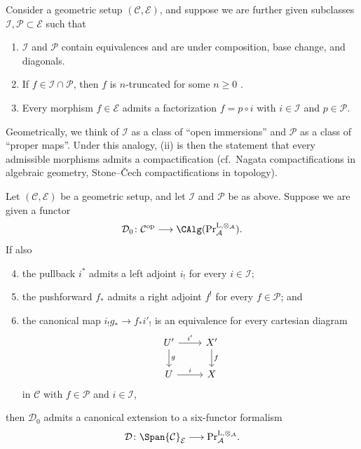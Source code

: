 Consider a geometric setup $(\mathcal C, \mathcal E)$, and suppose we are further given subclasses $\mathcal I, \mathcal P \subset \mathcal E$ such that
\begin{enumerate}[label=(\roman*)]
\item $\mathcal I$ and $\mathcal P$ contain equivalences and are under composition, base change, and diagonals.
\item If $f\in\mathcal I\cap\mathcal P$, then $f$ is $n$-truncated for some $n\geq 0$ \cite[Definition 5.5.6.8]{Lurie2009}. 
\item Every morphism $f \in \mathcal E$ admits a factorization $f = p \circ i$ with $i \in \mathcal I$ and $p \in \mathcal P$.
\end{enumerate}
Geometrically, we think of $\mathcal I$ as a class of ``open immersions'' and $\mathcal P$ as a class of ``proper maps''. Under this analogy, (ii) is then the statement that every admissible morphisms admits a compactification (cf.~Nagata compactifications in algebraic geometry, Stone--\v{C}ech compactifications in topology).
\begin{thm}\label{thm:construction-IP}
  Let $(\mathcal C, \mathcal E)$ be a geometric setup, and let $\mathcal I$ and $\mathcal P$ be as above. Suppose we are given a functor
  \[
    \mathcal D_0\colon\mathcal C^{\mathrm{op}}\longrightarrow\CAlg (\mathrm{Pr}^{\mathrm{L},\otimes_{\mathcal A}}_{\mathcal A}).
  \]
  If also
  \begin{enumerate}[label=(\roman*)]
    \setcounter{enumi}{3}
  \item the pullback $i^*$ admits a left adjoint $i_!$ for every $i\in\mathcal I$;
  \item the pushforward $f_*$ admits a right adjoint $f^!$ for every $f \in \mathcal P$; and
  \item the canonical map $i_!g_*\to f_*i'_!$ is an equivalence for every cartesian diagram
    \[
      \begin{tikzcd}
        U'\arrow[r,"i'"]\arrow[d,"g"]
        & X'\arrow[d,"f"] \\
        U\arrow[r,"i"]
        & X
      \end{tikzcd}
    \]
    in $\mathcal C$ with $f\in\mathcal P$ and $i\in\mathcal I$,
  \end{enumerate}
  then $\mathcal D_0$ admits a canonical extension to a six-functor formalism
  \[
    \mathcal D\colon\Span{\mathcal C}_{\mathcal E}\longrightarrow\mathrm{Pr}^{\mathrm{L},\otimes_{\mathcal A}}_{\mathcal A}.
  \]
\end{thm}

